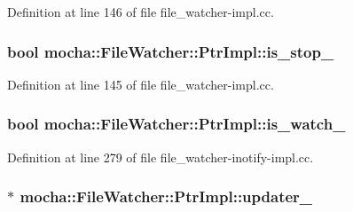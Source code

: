 Definition at line 146 of file file\_\-watcher-\/impl.cc.

\hypertarget{classmocha_1_1_file_watcher_1_1_ptr_impl_a268f932a057d3e6e92b0938d69bc6273}{
\subsubsection[{is\_\-stop\_\-}]{\setlength{\rightskip}{0pt plus 5cm}bool {\bf mocha::FileWatcher::PtrImpl::is\_\-stop\_\-}}}
\label{classmocha_1_1_file_watcher_1_1_ptr_impl_a268f932a057d3e6e92b0938d69bc6273}


Definition at line 145 of file file\_\-watcher-\/impl.cc.

\hypertarget{classmocha_1_1_file_watcher_1_1_ptr_impl_a2abd26bdb30b1a22d5625705d7b421ea}{
\subsubsection[{is\_\-watch\_\-}]{\setlength{\rightskip}{0pt plus 5cm}bool {\bf mocha::FileWatcher::PtrImpl::is\_\-watch\_\-}}}
\label{classmocha_1_1_file_watcher_1_1_ptr_impl_a2abd26bdb30b1a22d5625705d7b421ea}


Definition at line 279 of file file\_\-watcher-\/inotify-\/impl.cc.

\hypertarget{classmocha_1_1_file_watcher_1_1_ptr_impl_a5a8ecef4b0e028f33cd5b2d4ba4f926d}{
\subsubsection[{updater\_\-}]{$\ast$ {\bf mocha::FileWatcher::PtrImpl::updater\_\-}}}
\label{classmocha_1_1_file_watcher_1_1_ptr_impl_a5a8ecef4b0e028f33cd5b2d4ba4f926d}


